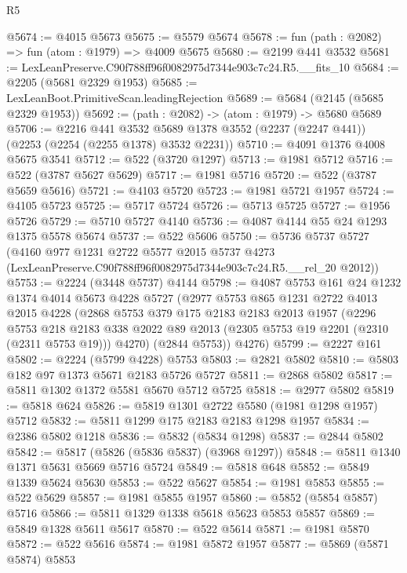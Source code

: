\begin{lexlean}{R5}
\begin{coremodule}
@5674 := @4015 @5673
@5675 := @5579 @5674
@5678 := fun (path : @2082) => fun (atom : @1979) => @4009 @5675
@5680 := @2199 @441 @3532
@5681 := LexLeanPreserve.C90f788ff96f0082975d7344e903c7c24.R5.__fits_10
@5684 := @2205 (@5681 @2329 @1953)
@5685 := LexLeanBoot.PrimitiveScan.leadingRejection
@5689 := @5684 (@2145 (@5685 @2329 @1953))
@5692 := (path : @2082) -> (atom : @1979) -> @5680 @5689
@5706 := @2216
    @441
    @3532
    @5689
    @1378
    @3552
    (@2237 (@2247 @441))
    (@2253 (@2254 (@2255 @1378) @3532 @2231))
@5710 := @4091 @1376 @4008 @5675 @3541
@5712 := @522 (@3720 @1297)
@5713 := @1981 @5712
@5716 := @522 (@3787 @5627 @5629)
@5717 := @1981 @5716
@5720 := @522 (@3787 @5659 @5616)
@5721 := @4103 @5720
@5723 := @1981 @5721 @1957
@5724 := @4105 @5723
@5725 := @5717 @5724
@5726 := @5713 @5725
@5727 := @1956 @5726
@5729 := @5710 @5727 @4140
@5736 := @4087 @4144 @55 @24 @1293 @1375 @5578 @5674
@5737 := @522 @5606
@5750 := @5736
    @5737
    @5727
    (@4160
      @977
      @1231
      @2722
      @5577
      @2015
      @5737
      @4273
      (LexLeanPreserve.C90f788ff96f0082975d7344e903c7c24.R5.__rel_20 @2012))
@5753 := @2224 (@3448 @5737) @4144
@5798 := @4087
    @5753
    @161
    @24
    @1232
    @1374
    @4014
    @5673
    @4228
    @5727
    (@2977
      @5753
      @865
      @1231
      @2722
      @4013
      @2015
      @4228
      (@2868
        @5753
        @379
        @175
        @2183
        @2183
        @2013
        @1957
        (@2296
          @5753
          @218
          @2183
          @338
          @2022
          @89
          @2013
          (@2305 @5753 @19 @2201 (@2310 (@2311 @5753 @19)))
          @4270)
        (@2844 @5753))
      @4276)
@5799 := @2227 @161
@5802 := @2224 (@5799 @4228) @5753
@5803 := @2821 @5802
@5810 := @5803 @182 @97 @1373 @5671 @2183 @5726 @5727
@5811 := @2868 @5802
@5817 := @5811 @1302 @1372 @5581 @5670 @5712 @5725
@5818 := @2977 @5802
@5819 := @5818 @624
@5826 := @5819 @1301 @2722 @5580 (@1981 @1298 @1957) @5712
@5832 := @5811 @1299 @175 @2183 @2183 @1298 @1957
@5834 := @2386 @5802 @1218
@5836 := @5832 (@5834 @1298)
@5837 := @2844 @5802
@5842 := @5817 (@5826 (@5836 @5837) (@3968 @1297))
@5848 := @5811 @1340 @1371 @5631 @5669 @5716 @5724
@5849 := @5818 @648
@5852 := @5849 @1339 @5624 @5630
@5853 := @522 @5627
@5854 := @1981 @5853
@5855 := @522 @5629
@5857 := @1981 @5855 @1957
@5860 := @5852 (@5854 @5857) @5716
@5866 := @5811 @1329 @1338 @5618 @5623 @5853 @5857
@5869 := @5849 @1328 @5611 @5617
@5870 := @522 @5614
@5871 := @1981 @5870
@5872 := @522 @5616
@5874 := @1981 @5872 @1957
@5877 := @5869 (@5871 @5874) @5853

\end{coremodule}
\end{lexlean}
